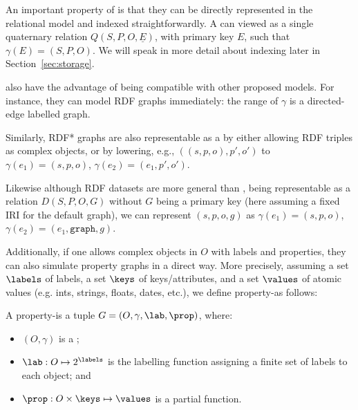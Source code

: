 
An important property of \datas is that they can be directly represented in the relational model and indexed straightforwardly. A \data can viewed as a single quaternary relation $Q(S,P,O,\underline{E})$, with primary key $E$, such that $\gamma(E)=(S,P,O)$. We will speak in more detail about indexing later in Section~\ref{sec:storage}.

\Datas also have the advantage of being compatible with other proposed models. For instance, they can model RDF graphs immediately: the range of $\gamma$ is a directed-edge labelled graph. 

Similarly, RDF* graphs are also representable as a \data by either allowing RDF triples as complex objects, or by lowering, e.g., $((s,p,o),p',o')$ to $\gamma(e_1) = (s,p,o)$, $\gamma(e_2) = (e_1,p',o')$.

Likewise although RDF datasets are more general than \data, being representable as a relation $D(S,P,O,G)$ without $G$ being a primary key (here assuming a fixed IRI for the default graph), we can represent $(s,p,o,g)$ as $\gamma(e_1) = (s,p,o)$, $\gamma(e_2) = (e_1,\texttt{graph},g)$.

Additionally, if one allows complex objects in $O$ with labels and properties, they can also simulate property graphs in a direct way. More precisely, assuming a set $\labels$ of labels, a set $\keys$ of keys/attributes, and a set $\values$ of atomic values  (e.g. ints, strings, floats, dates, etc.), we define property-\datas as follows:

\begin{definition}[Property-\data] 
 A property-\data is a tuple $G=(O,\gamma,\lab,\prop)$, where:
\begin{itemize}
    \item $(O,\gamma)$ is a \data;
    \item $\lab : O \mapsto 2^\labels$ is the labelling function assigning a finite set of labels to each object; and
    \item $\prop : O \times \keys \mapsto \values$ is a partial function.
\end{itemize}
\end{definition}

